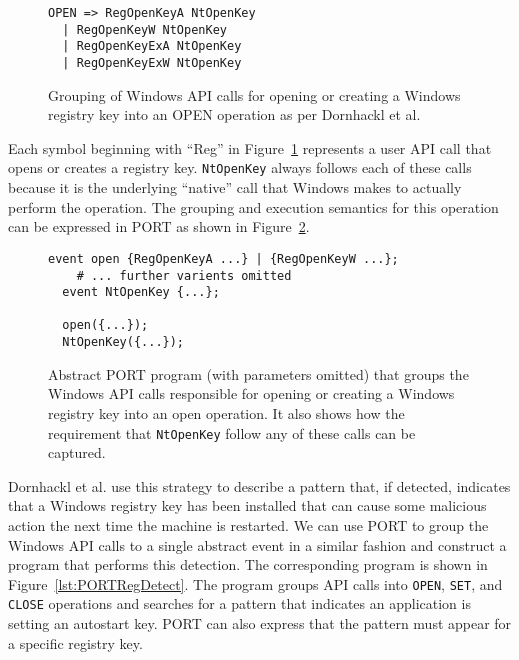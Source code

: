 \begin{figure}
\begin{lstlisting}
OPEN => RegOpenKeyA NtOpenKey
  | RegOpenKeyW NtOpenKey
  | RegOpenKeyExA NtOpenKey
  | RegOpenKeyExW NtOpenKey
\end{lstlisting}
\caption{Grouping of Windows API calls for opening or creating a Windows
  registry key into an OPEN operation as per Dornhackl et al.}
\label{lst:DornhacklOpen}
\end{figure}

Each symbol beginning with ``Reg'' in Figure~\ref{lst:DornhacklOpen} represents a user
API call that opens or creates a registry key.  {\tt NtOpenKey} always follows
each of these calls because it is the underlying ``native'' call that
Windows makes to actually perform the operation.
The grouping and execution semantics for this operation can be expressed
in PORT as shown in Figure~\ref{lst:PORTOpenReg}.

\begin{figure}
\begin{lstlisting}[gobble=2]
  event open {RegOpenKeyA ...} | {RegOpenKeyW ...};
    # ... further varients omitted
  event NtOpenKey {...};

  open({...});
  NtOpenKey({...});
\end{lstlisting}
  \caption{Abstract PORT program (with parameters
  omitted) that groups the Windows API calls responsible for opening or
  creating a Windows registry key into an open operation.  It also shows
  how the requirement that \lstinline+NtOpenKey+ follow any of these calls can be
  captured.}
\label{lst:PORTOpenReg}
\end{figure}

Dornhackl et al. use this strategy to describe a pattern that, if
detected, indicates that
a Windows registry key has been installed
that can cause some malicious action
the next time the machine is restarted.  We can use PORT to group the
Windows API calls to a single abstract event in a similar fashion and
construct a program that performs this detection.
The corresponding program is shown in Figure~\ref{lst:PORTRegDetect}.  The program groups API calls into \lstinline+OPEN+, \lstinline+SET+, and \lstinline+CLOSE+ operations and searches for a pattern that
indicates
an application is
setting an autostart key.  PORT can also express
that the pattern must appear for a specific registry key.

